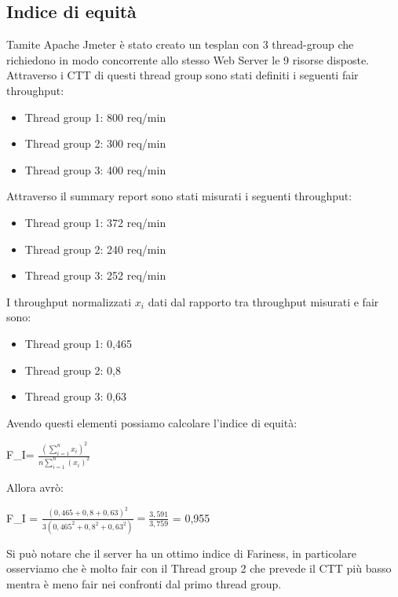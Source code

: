 \subsection{Indice di equità}
Tamite Apache Jmeter è stato creato un tesplan con 3 thread-group che richiedono in modo concorrente allo stesso Web Server le 9 risorse disposte.\\
Attraverso i CTT di questi thread group sono stati definiti i seguenti fair throughput:
\begin{itemize}
    \item Thread group 1: 800 req/min
    \item Thread group 2: 300 req/min
    \item Thread group 3: 400 req/min
\end{itemize}
Attraverso il summary report sono stati misurati i seguenti throughput:

\begin{itemize}
    \item Thread group 1: 372 req/min
    \item Thread group 2: 240 req/min
    \item Thread group 3: 252 req/min
\end{itemize}

I throughput normalizzati $x_{i}$ dati dal rapporto tra throughput misurati e fair sono: 
\begin{itemize}
    \item Thread group 1: 0,465
    \item Thread group 2: 0,8
    \item Thread group 3: 0,63
\end{itemize}
Avendo questi elementi possiamo calcolare l'indice di equità: 
\begin{center}
F\_I= $\frac{(\sum^n_{i=1}{x_i})^2}{n\sum^n_{i=1} (x_i)^2}$     
\end{center}
Allora avrò: 
\begin{center}
   F\_I =  $\frac{(0,465+0,8+0,63)^2}{3(0,465^2+0,8^2+0,63^2)} = \frac{3,591}{3,759}$ = 0,955
\end{center}
Si può notare che il server ha un ottimo indice di Fariness, in particolare osserviamo che è molto fair con il Thread group 2 che prevede il CTT più basso mentra è meno fair nei confronti dal primo thread group.
